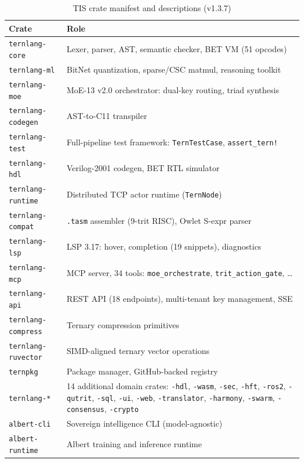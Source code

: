 \documentclass[journal,10pt,twocolumn]{IEEEtran}
\begin{document}
\begin{table}[h]
\centering
\small
\caption{TIS crate manifest and descriptions (v1.3.7)}
\label{tab:status}
\begin{tabular}{p{2.6cm}p{5.0cm}}
\toprule
Crate & Role \\
\midrule
\texttt{ternlang-core}      & Lexer, parser, AST, semantic checker, BET VM (51 opcodes) \\
\texttt{ternlang-ml}        & BitNet quantization, sparse/CSC matmul, reasoning toolkit \\
\texttt{ternlang-moe}       & MoE-13 v2.0 orchestrator: dual-key routing, triad synthesis \\
\texttt{ternlang-codegen}   & AST-to-C11 transpiler \\
\texttt{ternlang-test}      & Full-pipeline test framework: \texttt{TernTestCase}, \texttt{assert\_tern!} \\
\texttt{ternlang-hdl}       & Verilog-2001 codegen, BET RTL simulator \\
\texttt{ternlang-runtime}   & Distributed TCP actor runtime (\texttt{TernNode}) \\
\texttt{ternlang-compat}    & \texttt{.tasm} assembler (9-trit RISC), Owlet S-expr parser \\
\texttt{ternlang-lsp}       & LSP 3.17: hover, completion (19 snippets), diagnostics \\
\texttt{ternlang-mcp}       & MCP server, 34 tools: \texttt{moe\_orchestrate}, \texttt{trit\_action\_gate}, \ldots \\
\texttt{ternlang-api}       & REST API (18 endpoints), multi-tenant key management, SSE \\
\texttt{ternlang-compress}  & Ternary compression primitives \\
\texttt{ternlang-ruvector}  & SIMD-aligned ternary vector operations \\
\texttt{ternpkg}            & Package manager, GitHub-backed registry \\
\texttt{ternlang-*}         & 14 additional domain crates: \texttt{-hdl}, \texttt{-wasm}, \texttt{-sec}, \texttt{-hft}, \texttt{-ros2}, \texttt{-qutrit}, \texttt{-sql}, \texttt{-ui}, \texttt{-web}, \texttt{-translator}, \texttt{-harmony}, \texttt{-swarm}, \texttt{-consensus}, \texttt{-crypto} \\
\midrule
\texttt{albert-cli}         & Sovereign intelligence CLI (model-agnostic) \\
\texttt{albert-runtime}     & Albert training and inference runtime \\

\end{tabular}
\end{table}
\end{document}
